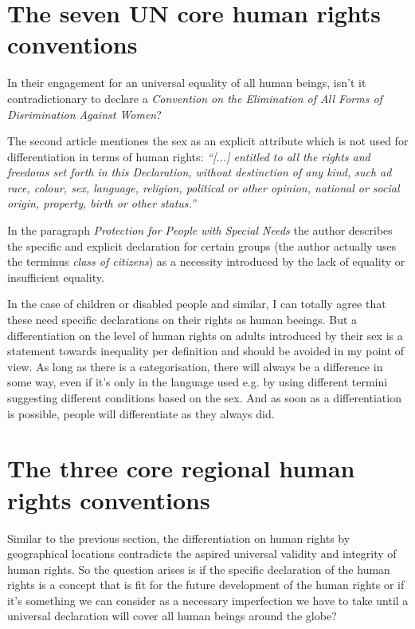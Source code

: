 \section{The seven UN core human rights conventions}
In their engagement for an universal equality of all human beings,
isn't it contradictionary to declare a \emph{Convention on the Elimination
of All Forms of Disrimination Against Women}?
\cite[p. 18]{tfohr}

The second article mentiones the sex as an explicit attribute which is not
used for differentiation in terms of human rights:\emph{
``[...] entitled to all the rights and freedoms set forth in this Declaration,
without destinction of any kind, such ad race, colour, sex, language, religion,
political or other opinion, national or social origin, property, birth or
other status.''}
\cite[p. 14]{tfohr}

In the paragraph \emph{Protection for People with Special Needs} the author
describes the specific and explicit declaration for certain groups (the author
actually uses the terminus \emph{class of citizens}) as a necessity introduced
by the lack of equality or insufficient equality.
\cite[. 29]{tfohr}



In the case of children or disabled people and similar, I can totally agree
that these need specific declarations on their rights as human beeings. But
a differentiation on the level of human rights on adults introduced by their
sex is a statement towards inequality per definition and should be avoided
in my point of view. As long as there is a categorisation, there will always
be a difference in some way, even if it's only in the language used e.g. by
using different termini suggesting different conditions based on the sex.
And as soon as a differentiation is possible, people will differentiate
as they always did.

\section{The three core regional human rights conventions}
Similar to the previous section, the differentiation on human rights by
geographical locations contradicts the aspired universal validity and integrity
of human rights. So the question arises is if the specific declaration of the
human rights is a concept that is fit for the future development of the human
rights or if it's something we can consider as a necessary imperfection we have
to take until a universal declaration will cover all human beings around the
globe?
\cite[p. 18]{tfohr}

